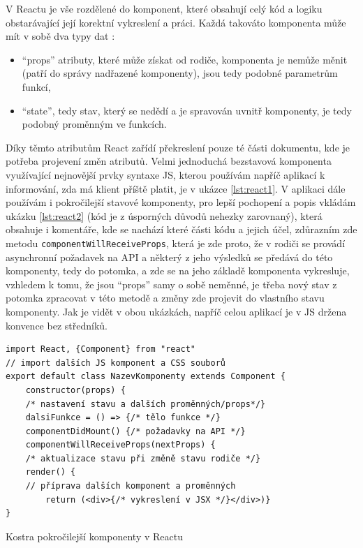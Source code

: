     V Reactu je vše rozdělené do komponent, které obsahují celý kód a logiku obstarávající její korektní vykreslení a práci. Každá takováto komponenta může mít v sobě dva typy dat \cite{react-docs1}:
    \begin{itemize}
        \item \enquote{props} atributy, které může získat od rodiče, komponenta je nemůže měnit (patří do správy nadřazené komponenty), jsou tedy podobné parametrům funkcí,
        \item \enquote{state}, tedy stav, který se nedědí a je spravován uvnitř komponenty, je tedy podobný proměnným ve funkcích.
    \end{itemize}
    Díky těmto atributům React zařídí překreslení pouze té části dokumentu, kde je potřeba projevení změn atributů. Velmi jednoduchá bezstavová komponenta využívající nejnovější prvky syntaxe JS, kterou používám napříč aplikací k informování, zda má klient příště platit, je v ukázce \ref{lst:react1}. V aplikaci dále používám i pokročilejší stavové komponenty, pro lepší pochopení a popis vkládám ukázku \ref{lst:react2} (kód je z úsporných důvodů nehezky zarovnaný), která obsahuje i komentáře, kde se nachází které části kódu a jejich účel, zdůrazním zde metodu \verb|componentWillReceiveProps|, která je zde proto, že v rodiči se provádí asynchronní požadavek na API a některý z jeho výsledků se předává do této komponenty, tedy do potomka, a zde se na jeho základě komponenta vykresluje, vzhledem k tomu, že jsou \enquote{props} samy o sobě neměnné, je třeba nový stav z potomka zpracovat v této metodě a změny zde projevit do vlastního stavu komponenty. Jak je vidět v obou ukázkách, napříč celou aplikací je v JS držena konvence bez středníků.
    
    \begin{listing}[ht]
    	\begin{verbatim}
import React, {Component} from "react"
// import dalších JS komponent a CSS souborů
export default class NazevKomponenty extends Component {
    constructor(props) {
    /* nastavení stavu a dalších proměnných/props*/}
    dalsiFunkce = () => {/* tělo funkce */}
    componentDidMount() {/* požadavky na API */}
    componentWillReceiveProps(nextProps) {
    /* aktualizace stavu při změně stavu rodiče */}
    render() {
    // příprava dalších komponent a proměnných
        return (<div>{/* vykreslení v JSX */}</div>)}
}
    	\end{verbatim}
    	\caption{Kostra pokročilejší komponenty v Reactu}\label{lst:react2}
    \end{listing}
    
